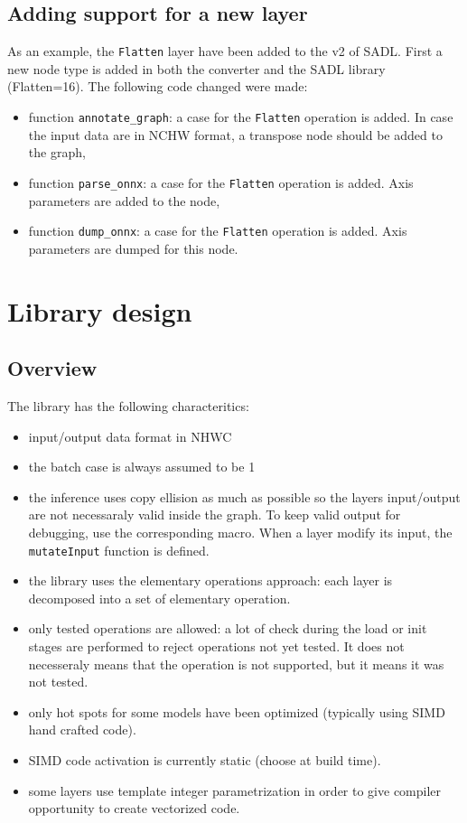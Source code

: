 \documentclass[10pt,a4paper]{article}
\begin{document}
\subsection{Adding support for a new layer}
As an example, the \texttt{Flatten} layer have been added to the v2 of SADL. First a new node type is added in both the converter and the SADL library (\textrm{Flatten=16}).
The following code changed were made:
\begin{itemize}
\item function \texttt{annotate\_graph}: a case for the \texttt{Flatten} operation is added. In case the input data are in NCHW format, a transpose node should be added to the graph,
\item function \texttt{parse\_onnx}: a case for the \texttt{Flatten} operation is added. Axis parameters are added to the node,
\item function \texttt{dump\_onnx}: a case for the \texttt{Flatten} operation is added. Axis parameters are dumped for this node.
\end{itemize}

\section{Library design}
\subsection{Overview}
The library has the following characteritics:
\begin{itemize}
\item input/output data format in NHWC
\item the batch case is always assumed to be 1
\item the inference uses copy ellision as much as possible so the layers input/output are not necessaraly valid inside the graph. To keep valid output for debugging, use the corresponding macro. When a layer modify its input, the \texttt{mutateInput} function is defined.
\item the library uses the elementary operations approach: each layer is decomposed into a set of elementary operation.
\item only tested operations are allowed: a lot of check during the load or init stages are performed to reject operations not yet tested. It does not necesseraly means that the operation is not supported, but it means it was not tested.
\item only hot spots for some models have been optimized (typically using SIMD hand crafted code). 
\item SIMD code activation is currently static (choose at build time).
\item some layers use template integer parametrization in order to give compiler opportunity to create vectorized code.
\end{itemize}
\end{document}
